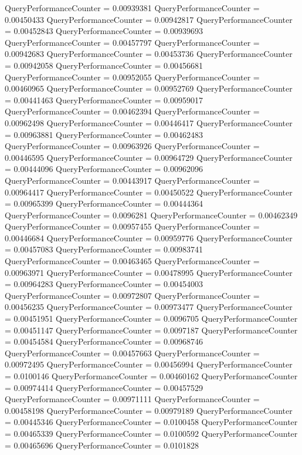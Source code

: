 \documentclass[9pt]{article}
\theoremstyle{plain}
\theoremstyle{definition}
\theoremstyle{remark}
\numberwithin{equation}{section}
\begin{document}
QueryPerformanceCounter  =  0.00939381
QueryPerformanceCounter  =  0.00450433
QueryPerformanceCounter  =  0.00942817
QueryPerformanceCounter  =  0.00452843
QueryPerformanceCounter  =  0.00939693
QueryPerformanceCounter  =  0.00457797
QueryPerformanceCounter  =  0.00942683
QueryPerformanceCounter  =  0.00453736
QueryPerformanceCounter  =  0.00942058
QueryPerformanceCounter  =  0.00456681
QueryPerformanceCounter  =  0.00952055
QueryPerformanceCounter  =  0.00460965
QueryPerformanceCounter  =  0.00952769
QueryPerformanceCounter  =  0.00441463
QueryPerformanceCounter  =  0.00959017
QueryPerformanceCounter  =  0.00462394
QueryPerformanceCounter  =  0.00962498
QueryPerformanceCounter  =  0.00446417
QueryPerformanceCounter  =  0.00963881
QueryPerformanceCounter  =  0.00462483
QueryPerformanceCounter  =  0.00963926
QueryPerformanceCounter  =  0.00446595
QueryPerformanceCounter  =  0.00964729
QueryPerformanceCounter  =  0.00444096
QueryPerformanceCounter  =  0.00962096
QueryPerformanceCounter  =  0.00443917
QueryPerformanceCounter  =  0.00964417
QueryPerformanceCounter  =  0.00450522
QueryPerformanceCounter  =  0.00965399
QueryPerformanceCounter  =  0.00444364
QueryPerformanceCounter  =  0.0096281
QueryPerformanceCounter  =  0.00462349
QueryPerformanceCounter  =  0.00957455
QueryPerformanceCounter  =  0.00446684
QueryPerformanceCounter  =  0.00959776
QueryPerformanceCounter  =  0.00457083
QueryPerformanceCounter  =  0.00983741
QueryPerformanceCounter  =  0.00463465
QueryPerformanceCounter  =  0.00963971
QueryPerformanceCounter  =  0.00478995
QueryPerformanceCounter  =  0.00964283
QueryPerformanceCounter  =  0.00454003
QueryPerformanceCounter  =  0.00972807
QueryPerformanceCounter  =  0.00456235
QueryPerformanceCounter  =  0.00973477
QueryPerformanceCounter  =  0.00451951
QueryPerformanceCounter  =  0.0096705
QueryPerformanceCounter  =  0.00451147
QueryPerformanceCounter  =  0.0097187
QueryPerformanceCounter  =  0.00454584
QueryPerformanceCounter  =  0.00968746
QueryPerformanceCounter  =  0.00457663
QueryPerformanceCounter  =  0.00972495
QueryPerformanceCounter  =  0.00456994
QueryPerformanceCounter  =  0.0100146
QueryPerformanceCounter  =  0.00460162
QueryPerformanceCounter  =  0.00974414
QueryPerformanceCounter  =  0.00457529
QueryPerformanceCounter  =  0.00971111
QueryPerformanceCounter  =  0.00458198
QueryPerformanceCounter  =  0.00979189
QueryPerformanceCounter  =  0.00445346
QueryPerformanceCounter  =  0.0100458
QueryPerformanceCounter  =  0.00465339
QueryPerformanceCounter  =  0.0100592
QueryPerformanceCounter  =  0.00465696
QueryPerformanceCounter  =  0.0101828
\end{document}
